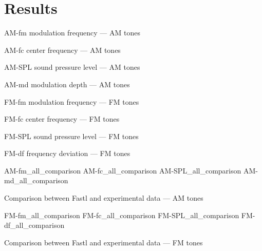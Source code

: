 \documentclass[../main.tex]{subfiles}
\begin{document}
\chapter{Results}

\begin{results}

\myfigurefastlexpstds%
  {AM-fm}
  {modulation frequency --- AM tones}

\myfigurefastlexpstds%
  {AM-fc}
  {center frequency --- AM tones}

\myfigurefastlexpstds%
  {AM-SPL}
  {sound pressure level --- AM tones}

\myfigurefastlexpstds%
  {AM-md}
  {modulation depth --- AM tones}

\myfigurefastlexpstds%
  {FM-fm}
  {modulation frequency --- FM tones}

\myfigurefastlexpstds%
  {FM-fc}
  {center frequency --- FM tones}

\myfigurefastlexpstds%
  {FM-SPL}
  {sound pressure level --- FM tones}

\myfigurefastlexpstds%
  {FM-df}
  {frequency deviation --- FM tones}

\myfigurequad%
  {AM-fm_all_comparison}
  {AM-fc_all_comparison}
  {AM-SPL_all_comparison}
  {AM-md_all_comparison}
  {
    \caption{Comparison between Fastl and experimental data --- AM tones}
    \label{fig:AM-comparison}
  }

\myfigurequad%
  {FM-fm_all_comparison}
  {FM-fc_all_comparison}
  {FM-SPL_all_comparison}
  {FM-df_all_comparison}
  {
    \caption{Comparison between Fastl and experimental data --- FM tones}
    \label{fig:FM-comparison}
  }

\end{results}
\end{document}
